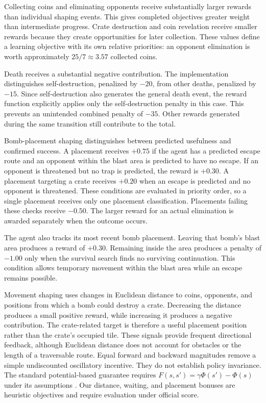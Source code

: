 \documentclass[11pt,a4paper]{article}
\begin{document}
Collecting coins and eliminating opponents receive substantially
larger rewards than individual shaping events. This gives completed
objectives greater weight than intermediate progress. Crate
destruction and coin revelation receive smaller rewards because they
create opportunities for later collection. These values define a
learning objective with its own relative priorities: an opponent
elimination is worth approximately $25/7 \approx 3.57$ collected coins.

Death receives a substantial negative contribution. The implementation
distinguishes self-destruction, penalized by $-20$, from other deaths,
penalized by $-15$. Since self-destruction also generates the general
death event, the reward function explicitly applies only the
self-destruction penalty in this case. This prevents an unintended
combined penalty of $-35$. Other rewards generated during the same
transition still contribute to the total.

Bomb-placement shaping distinguishes between predicted usefulness
and confirmed success. A placement receives $+0.75$ if the agent has
a predicted escape route and an opponent within the blast area is
predicted to have no escape. If an opponent is threatened but no trap
is predicted, the reward is $+0.30$. A placement targeting a crate
receives $+0.20$ when an escape is predicted and no opponent is
threatened. These conditions are evaluated in priority order, so a
single placement receives only one placement classification.
Placements failing these checks receive $-0.50$. The larger reward
for an actual elimination is awarded separately when the outcome
occurs.

The agent also tracks its most recent bomb placement. Leaving that
bomb's blast area produces a reward of $+0.30$. Remaining inside the
area produces a penalty of $-1.00$ only when the survival search finds
no surviving continuation. This condition allows temporary movement
within the blast area while an escape remains possible.

Movement shaping uses changes in Euclidean distance to coins,
opponents, and positions from which a bomb could destroy a crate.
Decreasing the distance produces a small positive reward, while
increasing it produces a negative contribution. The crate-related
target is therefore a useful placement position rather than the
crate's occupied tile. These signals provide frequent directional
feedback, although Euclidean distance does not account for obstacles
or the length of a traversable route. Equal forward and backward magnitudes remove a simple undiscounted
oscillatory incentive. They do not establish policy invariance. The standard
potential-based guarantee requires $F(s,s')=\gamma\Phi(s')-\Phi(s)$ under
its assumptions \citep{ng1999shaping}. Our distance, waiting, and placement
bonuses are heuristic objectives and require evaluation under official score.
\end{document}

